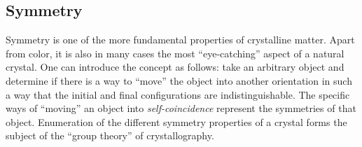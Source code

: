 \subsection{Symmetry\label{ssec:symmetry}}
Symmetry is one of the more fundamental properties of crystalline matter.  Apart from color, it is also in many cases the most ``eye-catching'' aspect of a natural crystal.  One can introduce the concept as follows: take an arbitrary object and determine if there is a way to ``move'' the object into another orientation in such a way that the initial and final configurations are indistinguishable.  The specific ways of ``moving'' an object into \textit{self-coincidence} represent the symmetries of that object.  Enumeration of the different symmetry properties of a crystal forms the subject of the ``group theory'' of crystallography.


